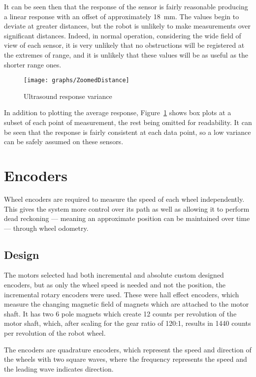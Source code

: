 It can be seen then that the response of the sensor is fairly reasonable producing a linear response with an offset of approximately \SI{18}{\milli\meter}. The values begin to deviate at greater distances, but the robot is unlikely to make measurements over significant distances. Indeed, in normal operation, considering the wide field of view of each sensor, it is very unlikely that no obstructions will be registered at the extremes of range, and it is unlikely that these values will be as useful as the shorter range ones.

\begin{figure}[!ht]
	\centering
	\texttt{[image: graphs/ZoomedDistance]}
	\caption{Ultrasound response variance}\label{fig:usboxplots}
\end{figure}

In addition to plotting the average response, Figure~\ref{fig:usboxplots} shows box plots at a subset of each point of measurement, the rest being omitted for readability. It can be seen that the response is fairly consistent at each data point, so a low variance can be safely assumed on these sensors.

\section{Encoders}\label{elec/encoder}
Wheel encoders are required to measure the speed of each wheel
independently. This gives the system more control over its path
as well as allowing it to perform dead reckoning --- meaning an approximate position can be maintained over time --- through wheel odometry.

\subsection{Design}\label{elec/encoder/design}
The motors selected had both incremental and absolute custom designed
encoders, but as only the wheel speed is needed and not the position,
the incremental rotary encoders were used. These were hall effect
encoders, which measure the changing magnetic field of magnets which
are attached to the motor shaft. It has two 6 pole magnets
which create 12 counts per revolution of the motor shaft, which, after
scaling for the gear ratio of 120:1, results in 1440 counts per
revolution of the robot wheel.

The encoders are quadrature encoders, which represent the speed and
direction of the wheels with two square waves, where the frequency
represents the speed and the leading wave indicates direction.

